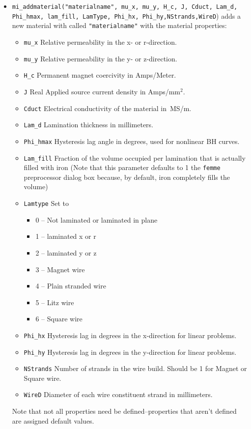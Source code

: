 \begin{itemize}
\item{\tt mi\_addmaterial("materialname", mu{\_}x, mu{\_}y, H{\_}c,
J, Cduct, Lam{\_}d, Phi{\_}hmax, lam{\_}fill, LamType, Phi{\_}hx, Phi{\_}hy,NStrands,WireD}) adds a
new material with called {\tt "materialname"} with the material
properties:
        \begin{itemize}
        \item{\tt mu{\_}x} Relative permeability in the x- or r-direction.
        \item{\tt mu{\_}y} Relative permeability in the y- or z-direction.
        \item{\tt H{\_}c} Permanent magnet coercivity in
        Amps/Meter.
        \item{\tt J} Real Applied source current density in Amps/mm$^2$.
        \item{\tt Cduct} Electrical conductivity of the material
        in~MS/m.
        \item{\tt Lam{\_}d} Lamination thickness in millimeters.
        \item{\tt Phi\_hmax} Hysteresis lag angle in degrees, used for nonlinear BH curves.
        \item{\tt Lam{\_}fill} Fraction of the volume occupied per lamination that
        is actually filled with iron (Note that this parameter defaults to 1 the
        {\tt femme} preprocessor dialog box because, by default, iron completely
        fills the volume)
        \item{\tt Lamtype} Set to
                \begin{itemize}
                \item 0 -- Not laminated or laminated in plane
                \item 1 -- laminated x or r
                \item 2 -- laminated y or z
                                \item 3 -- Magnet wire
                                \item 4 -- Plain stranded wire
                                \item 5 -- Litz wire
                                \item 6 -- Square wire
                \end{itemize}
        \item{\tt Phi\_hx} Hysteresis lag in degrees in the x-direction for linear problems.
        \item{\tt Phi\_hy} Hysteresis lag in degrees in the y-direction for linear problems.
                \item{\tt NStrands} Number of strands in the wire build.  Should be 1 for Magnet or Square wire.
                \item{\tt WireD} Diameter of each wire constituent strand in millimeters.
        \end{itemize}
Note that not all properties need be defined--properties that aren't defined are assigned default values.


\end{itemize}
